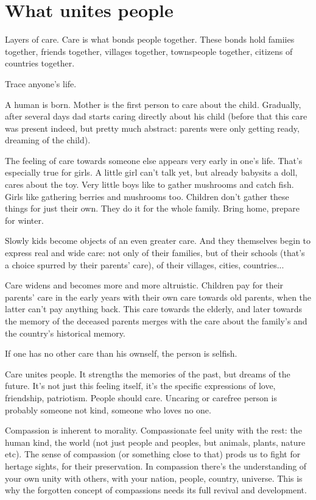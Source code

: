 \chapter{What unites people}

Layers of care. Care is what bonds people together. These bonds hold famiies together, friends together, villages together, townspeople together, citizens of countries together.

Trace anyone's life.

A human is born. Mother is the first person to care about the child. Gradually, after several days dad starts caring directly about his child (before that this care was present indeed, but pretty much abstract: parents were only getting ready, dreaming of the child).

The feeling of care towards someone else appears very early in one's life. That's especially true for girls. A little girl can't talk yet, but already babysits a doll, cares about the toy. Very little boys like to gather mushrooms and catch fish. Girls like gathering berries and mushrooms too. Children don't gather these things for just their own. They do it for the whole family. Bring home, prepare for winter.

Slowly kids become objects of an even greater care. And they themselves begin to express real and wide care: not only of their families, but of their schools (that's a choice spurred by their parents' care), of their villages, cities, countries...

Care widens and becomes more and more altruistic. Children pay for their parents' care in the early years with their own care towards old parents, when the latter can't pay anything back. This care towards the elderly, and later towards the memory of the deceased parents merges with the care about the family's and the country's historical memory.

If one has no other care than his ownself, the person is selfish.

Care unites people. It strengths the memories of the past, but dreams of the future. It's not just this feeling itself, it's the specific expressions of love, friendship, patriotism. People should care. Uncaring or carefree person is probably someone not kind, someone who loves no one.

Compassion is inherent to morality. Compassionate feel unity with the rest: the human kind, the world (not just people and peoples, but animals, plants, nature etc). The sense of compassion (or something close to that) prods us to fight for hertage sights, for their preservation. In compassion there's the understanding of your own unity with others, with your nation, people, country, universe. This is why the forgotten concept of compassions needs its full revival and development.

